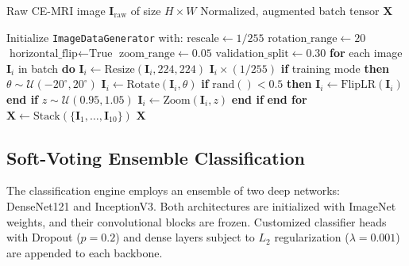 \documentclass[journal,twoside]{IEEEtran}
\begin{document}
\begin{algorithm}
\caption{Image Preprocessing and Data Augmentation Pipeline}
\label{alg:preprocessing}
\begin{algorithmic}[1]
\REQUIRE Raw CE-MRI image $\mathbf{I}_\text{raw}$ of size $H \times W$
\ENSURE Normalized, augmented batch tensor $\mathbf{X}$

\STATE Initialize \texttt{ImageDataGenerator} with:
\STATE \quad $\text{rescale} \leftarrow 1/255$
\STATE \quad $\text{rotation\_range} \leftarrow 20$
\STATE \quad $\text{horizontal\_flip} \leftarrow \text{True}$
\STATE \quad $\text{zoom\_range} \leftarrow 0.05$
\STATE \quad $\text{validation\_split} \leftarrow 0.30$
\STATE \textbf{for} each image $\mathbf{I}_i$ in batch \textbf{do}
\STATE \quad $\mathbf{I}_i \leftarrow \text{Resize}(\mathbf{I}_i, 224, 224)$
\STATE \quad $\mathbf{I}_i \times (1/255)$
\STATE \quad \textbf{if} training mode \textbf{then}
\STATE \quad\quad $\theta \sim \mathcal{U}(-20^\circ, 20^\circ)$
\STATE \quad\quad $\mathbf{I}_i \leftarrow \text{Rotate}(\mathbf{I}_i, \theta)$
\STATE \quad\quad \textbf{if} $\text{rand}() < 0.5$ \textbf{then}
\STATE \quad\quad\quad $\mathbf{I}_i \leftarrow \text{FlipLR}(\mathbf{I}_i)$
\STATE \quad\quad \textbf{end if}
\STATE \quad\quad $z \sim \mathcal{U}(0.95, 1.05)$
\STATE \quad\quad $\mathbf{I}_i \leftarrow \text{Zoom}(\mathbf{I}_i, z)$
\STATE \quad \textbf{end if}
\STATE \textbf{end for}
\STATE $\mathbf{X} \leftarrow \text{Stack}(\{\mathbf{I}_1, \ldots, \mathbf{I}_{10}\})$
\RETURN $\mathbf{X}$
\end{algorithmic}
\end{algorithm}

\subsection{Soft-Voting Ensemble Classification}
The classification engine employs an ensemble of two deep networks: DenseNet121 and InceptionV3. Both architectures are initialized with ImageNet weights, and their convolutional blocks are frozen. Customized classifier heads with Dropout ($p=0.2$) and dense layers subject to $L_2$ regularization ($\lambda = 0.001$) are appended to each backbone. 
\end{document}
